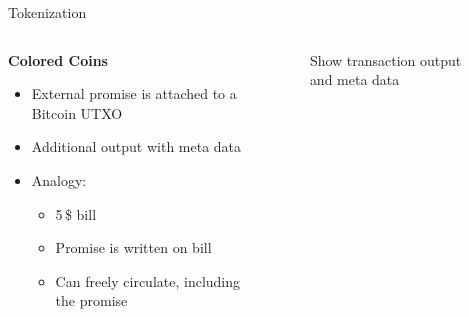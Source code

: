 \documentclass[]{beamer}
\begin{document}
\begin{frame}{Tokenization}
	\begin{columns}
		\begin{column}{0.6\textwidth}
			\textbf{Colored Coins}
			\begin{itemize}
				\item<2 -> External promise is attached to a Bitcoin UTXO
				\item<3 -> Additional output with meta data
				\item<4 -> Analogy: 
				\begin{itemize}
					\item<4 -> 5$\,$\$ bill
					\item<4 -> Promise is written on bill
					\item<4 -> Can freely circulate, including the promise
				\end{itemize}
			\end{itemize}
		\end{column}
		\begin{column}{0.4\textwidth}
			\begin{figure}
				\centering
				Show transaction output and meta data
			\end{figure}
		\end{column}
	\end{columns}
\end{frame}

\end{document}
